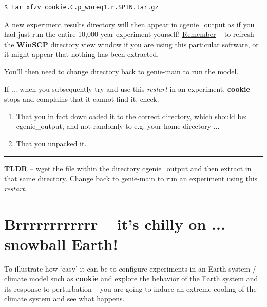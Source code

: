 \vspace{-2mm}\small\begin{verbatim}
$ tar xfzv cookie.C.p_woreq1.r.SPIN.tar.gz
\end{verbatim}\normalsize\vspace{-2mm}

A new experiment results directory will then appear in \textsf{\footnotesize cgenie\_output} as if you had just run the entire 10,000 year experiment yourself! \uline{Remember} -- to refresh the \textbf{WinSCP} directory view window if you are using this particular software, or it might appear that nothing has been extracted.

\vspace{1mm}
You’ll then need to change directory back to \textsf{\footnotesize genie-main} to run the model.

\vspace{1mm}
If ... when you subsequently try and use this \textit{restart} in an experiment, \textbf{cookie} stops and complains that it cannot find it, check:
\begin{enumerate}[noitemsep]
\item That you in fact downloaded it to the correct directory, which should be: \textsf{\footnotesize cgenie\_output}, and not randomly to e.g. your home directory ...
\item That you unpacked it.
\end{enumerate}

\vspace{1mm}\noindent\rule{4cm}{0.5pt}\vspace{2mm}

\noindent \textbf{TLDR} -- \textsf{\footnotesize wget} the file within the directory \textsf{\footnotesize cgenie\_output} and then extract in that same directory. Change back to \textsf{\footnotesize genie-main} to run an experiment using this \textit{restart}.

\newpage

\section{Brrrrrrrrrrrr – it’s chilly on ... snowball Earth!}

To illustrate how ‘easy’ it can be to configure experiments in an Earth system / climate model such as \textbf{cookie} and explore the behavior of the Earth system and its response to perturbation – you are going to induce an extreme cooling of the climate system and see what happens. 

